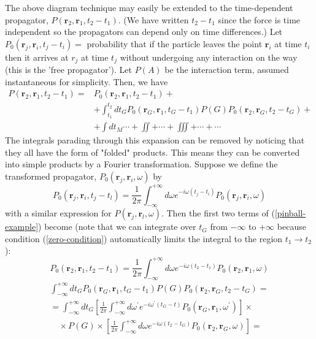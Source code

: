 The above diagram technique may easily be extended to the time-dependent propagator, $P\left(\mathbf{r}_{2}, \mathbf{r}_{1}, t_{2}-t_{1}\right) .$ (We have written $t_{2}-t_{1}$ since the force is time independent so the propagators can depend only on time differences.) Let $P_{0}\left(\mathbf{r}_{j}, \mathbf{r}_{i}, t_{j}-t_{i}\right)=$ probability that if the particle leaves the point $\mathbf{r}_{i}$ at time $t_{i}$ then it arrives at $r_{j}$ at time $t_{j}$ without undergoing any interaction on the way (this is the 'free propagator'). Let $P(A)$ be the interaction term, assumed instantaneous for simplicity. Then, we have
\begin{equation}\begin{aligned}
P\left(\mathbf{r}_{2}, \mathbf{r}_{1}, t_{2}-t_{1}\right)=& P_{0}\left(\mathbf{r}_{2}, \mathbf{r}_{1}, t_{2}-t_{1}\right)+\\
&+\int_{t_{1}}^{t_{2}} d t_{G} P_{0}\left(\mathbf{r}_{G}, \mathbf{r}_{1}, t_{G}-t_{1}\right) P(G) P_{0}\left(\mathbf{r}_{2}, \mathbf{r}_{G}, t_{2}-t_{G}\right)+\\
&+\int d t_{M} \cdots+\iint+\cdots+\iiint+\cdots+\cdots
\end{aligned}
\label{pinball-example}
\end{equation}
The integrals parading through this expansion can be removed by noticing that they all have the form of "folded" products. This means they can be converted into simple products by a Fourier transformation. Suppose we define the transformed propagator, $P_0(\mathbf{r}_j,\mathbf{r}_i,\omega)$ by
\begin{equation}P_{0}\left(\mathbf{r}_{j}, \mathbf{r}_{i}, t_{j}-t_{l}\right)=\frac{1}{2 \pi} \int_{-\infty}^{+\infty} d \omega e^{-i \omega\left(t_{j}-t_i\right)} P_{0}\left(\mathbf{r}_{j}, \mathbf{r}_{i}, \omega\right)\end{equation}
with a similar expression for $P\left(\mathbf{r}_{j}, \mathbf{r}_{l}, \omega\right) .$ Then the first two terms of (\ref{pinball-example}) become (note that we can integrate over $t_{G}$ from $-\infty$ to $+\infty$ because condition
(\ref{zero-condition}) automatically limits the integral to the region $t_{1} \rightarrow t_{2}$ ):
$$P_{0}\left(\mathbf{r}_{2}, \mathbf{r}_{1}, t_{2}-t_{1}\right)=\frac{1}{2 \pi} \int_{-\infty}^{+\infty} d \omega e^{-i \omega\left(t_{2}-t_{1}\right)} P_{0}\left(\mathbf{r}_{2}, \mathbf{r}_{1}, \omega\right)$$
$$\begin{array}{l}
\int_{-\infty}^{+\infty} d t_{G} P_{0}\left(\mathbf{r}_{G}, \mathbf{r}_{1}, t_{G}-t_{1}\right) P(G) P_{0}\left(\mathbf{r}_{2}, \mathbf{r}_{G}, t_{2}-t_{G}\right)= \\
=\int_{-\infty}^{+\infty} d t_{G}\left[\frac{1}{2 \pi} \int_{-\infty}^{+\infty} d \omega^{\prime} e^{-i \omega^{\prime}\left(t_{G}-t\right)} P_{0}\left(\mathbf{r}_{G}, \mathbf{r}_{1}, \omega^{\prime}\right)\right] \times \\
\quad \times P(G) \times\left[\frac{1}{2 \pi} \int_{-\infty}^{+\infty} d \omega e^{-i \omega\left(t_{2}-t_{G}\right)} P_{0}\left(\mathbf{r}_{2}, \mathbf{r}_{G}, \omega\right)\right]=
\end{array}$$
